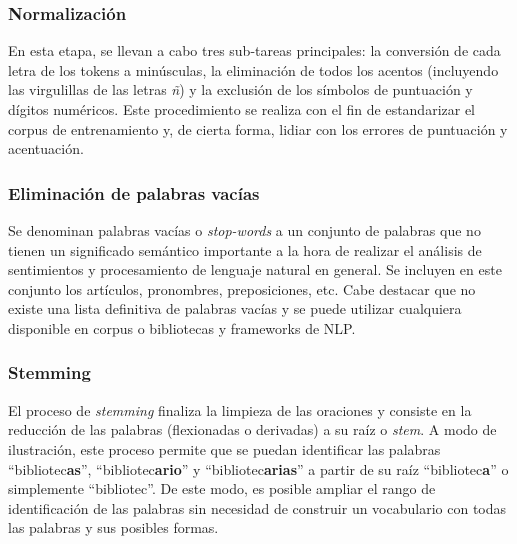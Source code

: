 \documentclass[conference]{IEEEtran}
\begin{document}
    	\subsubsection{Normalización}
    	
    		En esta etapa, se llevan a cabo tres sub-tareas principales: la conversión de cada letra de los tokens a minúsculas, la eliminación de todos los acentos (incluyendo las virgulillas de las letras \textit{ñ}) y la exclusión de los símbolos de puntuación y dígitos numéricos. Este procedimiento se realiza con el fin de estandarizar el corpus de entrenamiento y, de cierta forma, lidiar con los errores de puntuación y acentuación.
    		\newline	
    	
    	\subsubsection{Eliminación de palabras vacías}
    	
    		Se denominan palabras vacías o \textit{stop-words} a un conjunto de palabras que no tienen un significado semántico importante a la hora de realizar el análisis de sentimientos y procesamiento de lenguaje natural en general. Se incluyen en este conjunto los artículos, pronombres, preposiciones, etc. Cabe destacar que no existe una lista definitiva de palabras vacías y se puede utilizar cualquiera disponible en corpus o bibliotecas y frameworks de NLP.
    		\newline
    	
    	\subsubsection{Stemming}
    
    		El proceso de \textit{stemming} finaliza la limpieza de las oraciones y consiste en la reducción de las palabras (flexionadas o derivadas) a su raíz o \textit{stem}. A modo de ilustración, este proceso permite que se puedan identificar las palabras ``bibliotec\textbf{as}'', ``bibliotec\textbf{ario}'' y ``bibliotec\textbf{arias}'' a partir de su raíz ``bibliotec\textbf{a}'' o simplemente ``bibliotec''. De este modo, es posible ampliar el rango de identificación de las palabras sin necesidad de construir un vocabulario con todas las palabras y sus posibles formas. 
    		    
    
    
\end{document}
